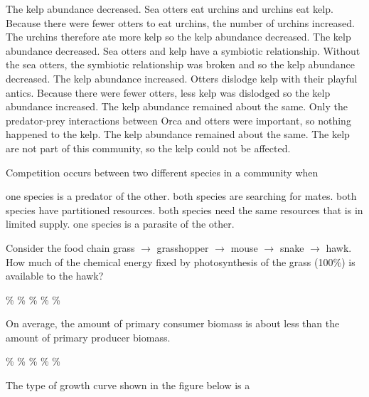 \begin{choices}
\correctchoice The kelp abundance decreased. Sea otters eat urchins and urchins eat kelp.  Because there were fewer otters to eat urchins, the number of urchins increased.  The urchins therefore ate more kelp so the kelp abundance decreased.
\choice The kelp abundance decreased. Sea otters and kelp have a symbiotic relationship. Without the sea otters, the symbiotic relationship was broken and so the kelp abundance decreased.
\choice The kelp abundance increased. Otters dislodge kelp with their playful antics.  Because there were fewer otters, less kelp was dislodged so the kelp abundance increased.
\choice The kelp abundance remained about the same. Only the predator-prey interactions between Orca and otters were important, so nothing happened to the kelp.
\choice The kelp abundance remained about the same. The kelp are not part of this community, so the kelp could not be affected.
\end{choices}

\question
Competition occurs between two different species in a community when

\begin{choices}
\choice one species is a predator of the other.
\choice both species are searching for mates.
\choice both species have partitioned resources.
\correctchoice both species need the same resources that is in limited supply.
\choice one species is a parasite of the other.
\end{choices}

\question
Consider the food chain grass $\to$ grasshopper $\to$ mouse $\to$ snake $\to$ hawk. How much of the chemical energy fixed by photosynthesis of the grass (100\%) is available to the hawk?

\begin{choices}
\%
\%
\%
\%
\%
\end{choices}

\question
On average, the amount of primary consumer biomass is about \underline{\hspace{2cm}} less than the amount of primary producer biomass.

\begin{choices}
\%
\%
\%
\%
\%
\end{choices}

\question
The type of growth curve shown in the figure below is a


